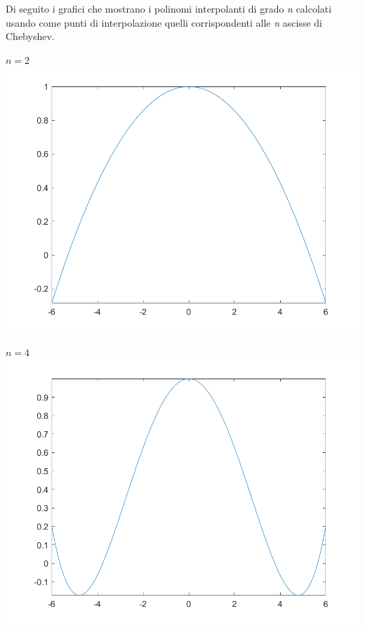 \begin{center}
\footnotesize\noindent{}\end{center}

\noindent Di seguito i grafici che mostrano i polinomi interpolanti di
grado \textit{n} calcolati usando come punti di interpolazione quelli
corrispondenti alle \textit{n} ascisse di Chebyshev.


\begin{center}
	\(n=2\) \\
	\includegraphics[scale=0.55]{cap4/4_7/2.png}
\end{center}

\begin{center}
	\(n=4\) \\
	\includegraphics[scale=0.55]{cap4/4_7/4.png}
\end{center}

